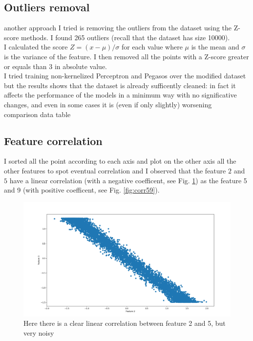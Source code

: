\subsection{Outliers removal}
another approach I tried is removing the outliers from the dataset using the Z-score methods.
I found 265 outliers (recall that the dataset has size 10000).\\
I calculated the score $ Z = (x - \mu) / \sigma$ for each value where $\mu$ is the mean and $\sigma$ is the variance of the feature.
I then removed all the points with a Z-score greater or equals than $3$ in absolute value.\\
I tried training non-kernelized Perceptron and Pegasos over the modified dataset but the results shows that the dataset is already sufficently cleaned: in fact it  
affects the performance of the models in a minimum way with no significative changes, and even in some cases it is (even if only slightly) worsening\\

comparison data table\\

\subsection{Feature correlation}
I sorted all the point according to each axis and plot on the other axis all the other features to spot eventual correlation and I observed that the feature $2$ and $5$ have a linear correlation (with a negative coefficent, see Fig. \ref{fig:corr25}) as the feature 5 and 9 (with positive coefficent, see Fig. \ref{fig:corr59}).\\ 

\begin{figure}[h]
    \includegraphics[width=\textwidth]{images/feature_2_5_correlation.png}
    \caption{Here there is a clear linear correlation between feature 2 and 5, but very noisy}
    \label{fig:corr25}
\end{figure}

